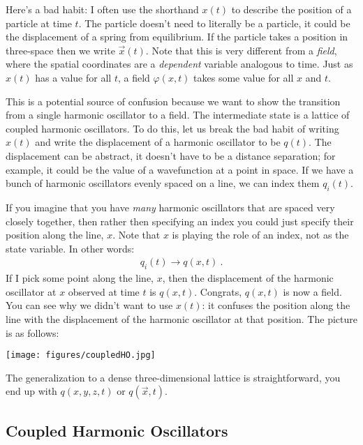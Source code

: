 Here's a bad habit: I often use the shorthand $x(t)$ to describe the position of a particle at time $t$. The particle doesn't need to literally be a particle, it could be the displacement of a spring from equilibrium. If the particle takes a position in three-space then we write $\vec{x}(t)$. Note that this is very different from a \emph{field}, where the spatial coordinates are a \emph{dependent} variable analogous to time. Just as $x(t)$ has a value for all $t$, a field $\varphi(x,t)$ takes some value for all $x$ and $t$. 

This is a potential source of confusion because we want to show the transition from a single harmonic oscillator to a field. The intermediate state is a lattice of coupled harmonic oscillators. To do this, let us break the bad habit of writing $x(t)$ and write the displacement of a harmonic oscillator to be $q(t)$. The displacement can be abstract, it doesn't have to be a distance separation; for example, it could be the value of a wavefunction at a point in space. If we have a bunch of harmonic oscillators evenly spaced on a line, we can index them $q_i(t)$. 

If you imagine that you have \emph{many} harmonic oscillators that are spaced very closely together, then rather then specifying an index you could just specify their position along the line, $x$. Note that $x$ is playing the role of an index, not as the state variable. In other words:
\begin{align}
	q_i(t) \to q(x,t) \ .
\end{align}
If I pick some point along the line, $x$, then the displacement of the harmonic oscillator at $x$ observed at time $t$ is $q(x,t)$. Congrats, $q(x,t)$ is now a field. You can see why we didn't want to use $x(t)$: it confuses the position along the line with the displacement of the harmonic oscillator at that position. 
%
The picture is as follows:
\begin{center}
\texttt{[image: figures/coupledHO.jpg]}
\end{center}
The generalization to a dense three-dimensional lattice is straightforward, you end up with $q(x,y,z,t)$ or $q(\vec{x},t)$.


\subsection{Coupled Harmonic Oscillators}
\label{sec:CHO}

